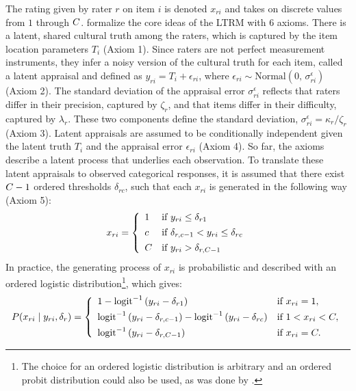 \documentclass{article}
\newcommand{\Irater}{r}
\newcommand{\Iitem}{i}
\newcommand{\Incat}{c}
\newcommand{\Tncat}{\expandafter\MakeUppercase\expandafter{\Incat}}
\newcommand{\ilogit}[1]{\text{logit}^{-1}\left(#1\right)}
\newcommand{\dnorm}[2]{\text{Normal}\left(#1,\,#2\right)}
\begin{document}
The rating given by rater $\Irater$ on item $\Iitem$ is denoted $x_{\Irater\Iitem}$ and takes on discrete values from $1$ through $\Tncat$.  formalize the core ideas of the LTRM with 6 axioms. There is a latent, shared cultural truth among the raters, which is captured by the item location parameters $T_\Iitem$ (Axiom 1). Since raters are not perfect measurement instruments, they infer a noisy version of the cultural truth for each item, called a latent appraisal and defined as $y_{\Irater\Iitem} = T_\Iitem + \epsilon_{\Irater\Iitem}$, where $\epsilon_{\Irater\Iitem}\sim \dnorm{0}{\sigma^\epsilon_{\Irater\Iitem}}$ (Axiom 2). The standard deviation of the appraisal error $\sigma^\epsilon_{\Irater\Iitem}$ reflects that raters differ in their precision, captured by $\zeta_\Irater$, and that items differ in their difficulty, captured by $\lambda_\Irater$. These two components define the standard deviation, $\sigma^\epsilon_{\Irater\Iitem} = \kappa_\Irater / \zeta_\Irater$ (Axiom 3). Latent appraisals are assumed to be conditionally independent given the latent truth $T_\Iitem$ and the appraisal error $\epsilon_{\Irater\Iitem}$ (Axiom 4). So far, the axioms describe a latent process that underlies each observation. To translate these latent appraisals to observed categorical responses, it is assumed that there exist $\Tncat - 1$ ordered thresholds $\delta_{\Irater\Incat}$, such that each $x_{\Irater\Iitem}$ is generated in the following way (Axiom 5):
\begin{align*}
	x_{\Irater\Iitem} = 
	\left\{\begin{array}{ll} 
	1		& \text{if } y_{\Irater\Iitem} \leq \delta_{\Irater 1} \\[4pt]
	\Incat	& \text{if } \delta_{\Irater, \Incat-1} < y_{\Irater\Iitem} \leq \delta_{\Irater\Incat} \\[4pt]
	\Tncat	& \text{if } y_{\Irater\Iitem} > \delta_{\Irater, \Tncat-1}
	\end{array} \right.
\end{align*}
In practice, the generating process of $x_{\Irater\Iitem}$ is probabilistic and described with an ordered logistic distribution\footnote{The choice for an ordered logistic distribution is arbitrary and an ordered probit distribution could also be used, as was done by .}, which gives:
\begin{align*}
P(x_{\Irater\Iitem}\mid y_{\Irater\Iitem},\delta_{\Irater}) = 
\left\{\begin{array}{ll} 
1 - \ilogit{y_{\Irater\Iitem} - \delta_{\Irater 1}}         & \text{if } x_{\Irater\Iitem} = 1, \\[4pt]
\ilogit{y_{\Irater\Iitem} - \delta_{\Irater,\Incat-1}} - 
\ilogit{y_{\Irater\Iitem} - \delta_{\Irater\Incat}}         & \text{if } 1 < x_{\Irater\Iitem} < \Tncat,\\[4pt]
\ilogit{y_{\Irater\Iitem} - \delta_{\Irater,\Tncat-1}}       & \text{if } x_{\Irater\Iitem} = \Tncat. 
\end{array} \right.
\end{align*}
\end{document}
